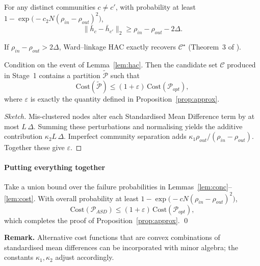 \documentclass[final,3p,fleqn, 10pt]{elsarticle}
\begin{document}
\begin{lemma}\label{lem:sep}
For any distinct communities $c\neq c'$, with probability at least $1-\exp\!\bigl(-c_2 N(\rho_{in}-\rho_{out})^{2}\bigr)$,
\[\|\bar h_{c}-\bar h_{c'}\|_2\ge\rho_{in}-\rho_{out}-2\Delta.\]
\end{lemma}

\begin{lemma}\label{lem:hac}
If $\rho_{in}-\rho_{out}>2\Delta$, Ward–linkage HAC exactly recovers $\mathcal{C}^{\star}$ (Theorem~3 of \citealp{vonLuxburg2010}).
\end{lemma}

\begin{lemma}\label{lem:cost}
Condition on the event of Lemma~\ref{lem:hac}.  Then the candidate set $\mathcal{C}$ produced in Stage~1 contains a partition $\tilde{\mathcal P}$ such that
\[\text{Cost}(\tilde{\mathcal P})\le(1+\varepsilon)\,\text{Cost}(\mathcal P_{opt}),\]
where $\varepsilon$ is exactly the quantity defined in Proposition~\ref{prop:approx}.
\end{lemma}
\begin{proof}[Sketch]
Mis-clustered nodes alter each Standardised Mean Difference term by at most $L\,\Delta$.  Summing these perturbations and normalising yields the additive contribution $\kappa_{2}L\,\Delta$.  Imperfect community separation adds $\kappa_{1}\rho_{out}/(\rho_{in}-\rho_{out})$.  Together these give $\varepsilon$.
\end{proof}

\paragraph{Putting everything together}  Take a union bound over the failure probabilities in Lemmas~\ref{lem:conc}–\ref{lem:cost}.  With overall probability at least $1-\exp\!\bigl(-c N(\rho_{in}-\rho_{out})^{2}\bigr)$,
\[\text{Cost}(\mathcal P_{ASD})\le(1+\varepsilon)\,\text{Cost}(\mathcal P_{opt}),\]
which completes the proof of Proposition~\ref{prop:approx}.  \qed

\bigskip

\noindent\textbf{Remark.} Alternative cost functions that are convex combinations of standardised mean differences can be incorporated with minor algebra; the constants $\kappa_1,\kappa_2$ adjust accordingly.
\end{document}
